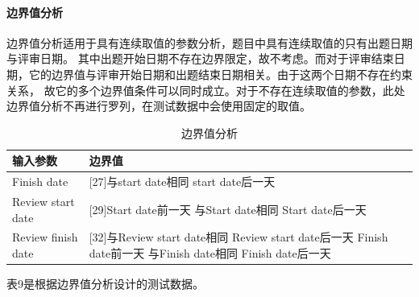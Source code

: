 \documentclass[hyperref, a4paper]{ctexart}
\let\oldparagraph\paragraph
\renewcommand{\paragraph}[1]{\oldparagraph{#1}\mbox{}}
\begin{document}
\begin{table}[!htbp]
\begin{tabular}{|p{0.35cm}|p{1.2cm}|p{0.22cm}|p{0.22cm}|p{0.22cm}|p{0.22cm}|p{0.22cm}|p{0.22cm}|p{0.9cm}|p{0.9cm}|p{0.9cm}|p{0.9cm}|p{0.22cm}|p{0.8cm}|}
  \hline
  \end{tabular}
\end{table}

\pagebreak

\hypertarget{ux8fb9ux754cux503cux5206ux6790}{%
\paragraph{边界值分析}\label{ux8fb9ux754cux503cux5206ux6790}}

边界值分析适用于具有连续取值的参数分析，题目中具有连续取值的只有出题日期与评审日期。
其中出题开始日期不存在边界限定，故不考虑。而对于评审结束日期，它的边界值与评审开始日期和出题结束日期相关。由于这两个日期不存在约束关系，
故它的多个边界值条件可以同时成立。对于不存在连续取值的参数，此处边界值分析不再进行罗列，在测试数据中会使用固定的取值。

\begin{table}[!htbp]
  \caption{边界值分析}
  \label{Tab:bookRWCal}
  \centering
  \begin{tabular}{|p{6.0cm}|p{6.5cm}|}
  \hline
  \textbf{输入参数} &\textbf{边界值} \\
  \hline
  Finish date     & [27]与start date相同   \newline [28] start date后一天 \\
  \hline
  Review start date     & [29]Start date前一天     \newline [30]与Start date相同  \newline  [31]Start date后一天 \\
  \hline
  Review finish date     & [32]与Review start date相同     \newline [33]Review start date后一天 \newline [34]Finish date前一天 \newline [35]与Finish date相同  \newline  [36]Finish date后一天\\
  \hline
  \end{tabular}
\end{table}

表9是根据边界值分析设计的测试数据。
\end{document}
